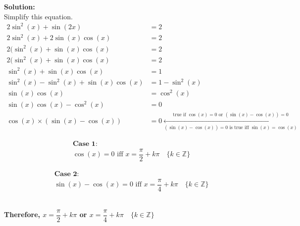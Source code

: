 \documentclass[12pt]{book}
\begin{document}
\begin{enumerate}
\textbf{Solution:}\\
Simplify this equation.
\begin{align*}
    2\sin^2(x) + \sin(2x) &= 2\\
    2\sin^2(x) + 2\sin(x)\cos(x) &= 2\\
    2(\sin^2(x) + \sin(x)\cos(x) &= 2\\
    2(\sin^2(x) + \sin(x)\cos(x) &= 2\\
    \sin^2(x) + \sin(x)\cos(x) &= 1\\
    \sin^2(x) - \sin^2(x) + \sin(x)\cos(x) &= 1 - \sin^2(x)\\
    \sin(x)\cos(x) &= \cos^2(x) \\
    \sin(x)\cos(x) - \cos^2(x) &= 0 \\
    \cos(x) \times (\sin(x) - \cos(x)) &= 0 \xleftarrow[(\sin(x) - \cos(x)) = 0 \text{ is true iff } \sin(x) = \cos(x)]{\text{true if } \cos(x) = 0 \text{ or } (\sin(x) - \cos(x)) = 0}
\end{align*}
\begin{minipage}{.5\textwidth}
    \begin{align*}
        &\textbf{Case 1:}\\
        &\cos(x) = 0 \text{ iff } x = \dfrac{\pi}{2} + k\pi \quad \{k \in \mathbb{Z}\}
    \end{align*}
\end{minipage}
\begin{minipage}{.5\textwidth}
    \begin{align*}
        &\textbf{Case 2:}\\
        &\sin(x) - \cos(x) = 0 \text{ iff } x = \dfrac{\pi}{4} + k\pi \quad \{k \in \mathbb{Z}\}
    \end{align*}
\end{minipage}\\

\textbf{Therefore, $x = \dfrac{\pi}{2} + k\pi$ or $x = \dfrac{\pi}{4} + k\pi \quad \{k \in \mathbb{Z}\}$}


\newpage


\end{enumerate}
\end{document}
